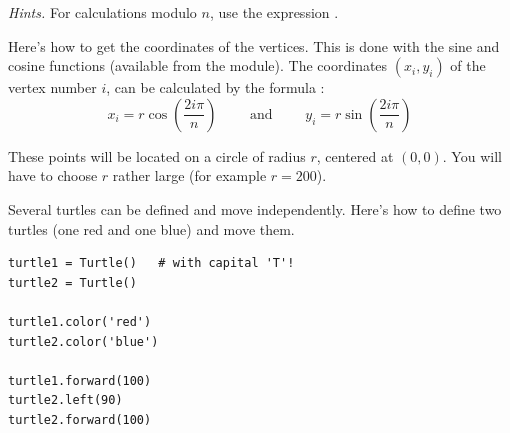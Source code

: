 \documentclass[11pt,class=report,crop=false]{standalone}
\begin{document}
\begin{activite}
\emph{Hints.} For calculations modulo $n$, use the expression .


Here's how to get the coordinates of the vertices. This is done with the sine and cosine functions (available from the  module).
The coordinates $(x_i,y_i)$ of the vertex number $i$, can be calculated by the formula :
$$x_i = r \cos\left(\frac{2 i \pi}{n}\right) \qquad \text{ and } \qquad y_i = r\sin\left(\frac{2 i \pi}{n}\right)$$

These points will be located on a circle of radius $r$, centered at $(0,0)$. 
You will have to choose $r$ rather large (for example $r=200$).



\end{activite}


\begin{cours}

Several turtles can be defined and move independently.
Here's how to define two turtles (one red and one blue) and move them.

\begin{lstlisting}
turtle1 = Turtle()   # with capital 'T'!
turtle2 = Turtle()

turtle1.color('red')
turtle2.color('blue')

turtle1.forward(100)
turtle2.left(90)
turtle2.forward(100)
\end{lstlisting}

\end{cours}


\end{document}
